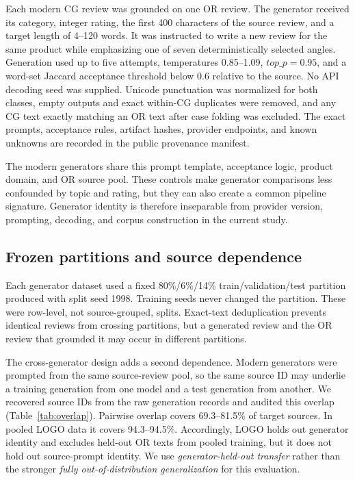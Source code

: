 \documentclass[utf8]{FrontiersinHarvard}
\begin{document}
Each modern CG review was grounded on one OR review. The generator received its category, integer rating, the first 400 characters of the source review, and a target length of 4--120 words. It was instructed to write a new review for the same product while emphasizing one of seven deterministically selected angles. Generation used up to five attempts, temperatures 0.85--1.09, $top\_p=0.95$, and a word-set Jaccard acceptance threshold below 0.6 relative to the source. No API decoding seed was supplied. Unicode punctuation was normalized for both classes, empty outputs and exact within-CG duplicates were removed, and any CG text exactly matching an OR text after case folding was excluded. The exact prompts, acceptance rules, artifact hashes, provider endpoints, and known unknowns are recorded in the public provenance manifest.

The modern generators share this prompt template, acceptance logic, product domain, and OR source pool. These controls make generator comparisons less confounded by topic and rating, but they can also create a common pipeline signature. Generator identity is therefore inseparable from provider version, prompting, decoding, and corpus construction in the current study.

\subsection{Frozen partitions and source dependence}

Each generator dataset used a fixed 80\%/6\%/14\% train/validation/test partition produced with split seed 1998. Training seeds never changed the partition. These were row-level, not source-grouped, splits. Exact-text deduplication prevents identical reviews from crossing partitions, but a generated review and the OR review that grounded it may occur in different partitions.

The cross-generator design adds a second dependence. Modern generators were prompted from the same source-review pool, so the same source ID may underlie a training generation from one model and a test generation from another. We recovered source IDs from the raw generation records and audited this overlap (Table~\ref{tab:overlap}). Pairwise overlap covers 69.3--81.5\% of target sources. In pooled LOGO data it covers 94.3--94.5\%. Accordingly, LOGO holds out generator identity and excludes held-out OR texts from pooled training, but it does not hold out source-prompt identity. We use \emph{generator-held-out transfer} rather than the stronger \emph{fully out-of-distribution generalization} for this evaluation.
\end{document}
